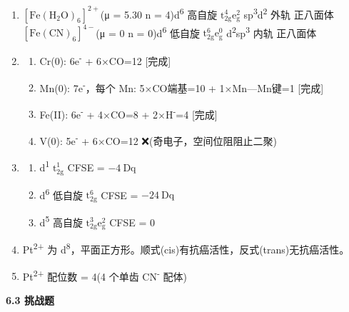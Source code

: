 \begin{enumerate}
\def\labelenumi{\arabic{enumi}.}
\setcounter{enumi}{4}
\item
  \textbf{\([\mathrm{Fe(H_2O)_6}]^{2+}\)}(μ = 5.30 \箭 n = 4)\箭 d\textsuperscript{6} 高自旋 \(\mathrm{t_{2g}^4 e_g^2}\) \箭 sp\textsuperscript{3}d\textsuperscript{2} 外轨 \箭 正八面体
  \textbf{\([\mathrm{Fe(CN)_6}]^{4-}\)}(μ = 0 \箭 n = 0)\箭 d\textsuperscript{6} 低自旋 \(\mathrm{t_{2g}^6 e_g^0}\) \箭 d\textsuperscript{2}sp\textsuperscript{3} 内轨 \箭 正八面体
\item
  \begin{enumerate}
  \def\labelenumii{(\arabic{enumii})}
  \tightlist
  \item
    Cr(0): 6e\textsuperscript{-} + 6×CO=12  {[}完成{]}
  \item
    Mn(0): 7e\textsuperscript{-}，每个 Mn: 5×CO端基=10 + 1×Mn---Mn键=1  {[}完成{]}
  \item
    Fe(II): 6e\textsuperscript{-} + 4×CO=8 + 2×H\textsuperscript{-}=4  {[}完成{]}
  \item
    V(0): 5e\textsuperscript{-} + 6×CO=12  ❌(奇电子，空间位阻阻止二聚)
  \end{enumerate}
\item
  \begin{enumerate}
  \def\labelenumii{(\arabic{enumii})}
  \tightlist
  \item
    d\textsuperscript{1} \箭 \(\mathrm{t_{2g}^1}\) \箭 CFSE = \(-4\ \mathrm{Dq}\)
  \item
    d\textsuperscript{6} 低自旋 \箭 \(\mathrm{t_{2g}^6}\) \箭 CFSE = \(-24\ \mathrm{Dq}\)
  \item
    d\textsuperscript{5} 高自旋 \箭 \(\mathrm{t_{2g}^3 e_g^2}\) \箭 CFSE = 0
  \end{enumerate}
\item
  Pt\textsuperscript{2+} 为 d\textsuperscript{8}，平面正方形。顺式(cis)有抗癌活性，反式(trans)无抗癌活性。
\item
  Pt\textsuperscript{2+} 配位数 = 4(4 个单齿 CN\textsuperscript{-} 配体)
\end{enumerate}

\textbf{6.3 挑战题}

